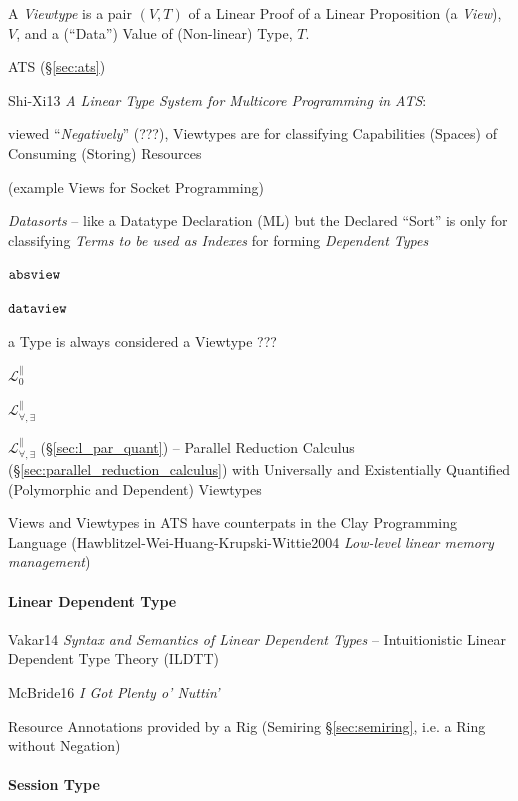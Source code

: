 A \emph{Viewtype} is a pair $(V,T)$ of a Linear Proof of a Linear
Proposition (a \emph{View}), $V$, and a (``Data'') Value of
(Non-linear) Type, $T$.

ATS (\S\ref{sec:ats})

Shi-Xi13 \emph{A Linear Type System for Multicore Programming in ATS}:

viewed ``\emph{Negatively}'' (???), Viewtypes are for classifying
Capabilities (Spaces) of Consuming (Storing) Resources %

(example Views for Socket Programming) %

\emph{Datasorts} -- like a Datatype Declaration (ML) but the Declared
``Sort'' is only for classifying \emph{Terms to be used as Indexes}
for forming \emph{Dependent Types}

$\mathtt{absview}$

$\mathtt{dataview}$

a Type is always considered a Viewtype ??? %

$\mathcal{L}^\parallel_0$

$\mathcal{L}^\parallel_{\forall, \exists}$

\fist $\mathcal{L}^\parallel_{\forall,\exists}$
(\S\ref{sec:l_par_quant}) -- Parallel Reduction Calculus
(\S\ref{sec:parallel_reduction_calculus}) with Universally and
Existentially Quantified (Polymorphic and Dependent) Viewtypes

Views and Viewtypes in ATS have counterpats in the Clay Programming
Language (Hawblitzel-Wei-Huang-Krupski-Wittie2004 \emph{Low-level
  linear memory management})



\paragraph{Linear Dependent Type}\label{sec:dependent_linear}\hfill

Vakar14 \emph{Syntax and Semantics of Linear Dependent Types} --
Intuitionistic Linear Dependent Type Theory (ILDTT)

McBride16 \emph{I Got Plenty o' Nuttin'}

Resource Annotations provided by a Rig (Semiring \S\ref{sec:semiring},
i.e. a Ring without Negation)



\paragraph{Session Type}\label{sec:session_type}\hfill

